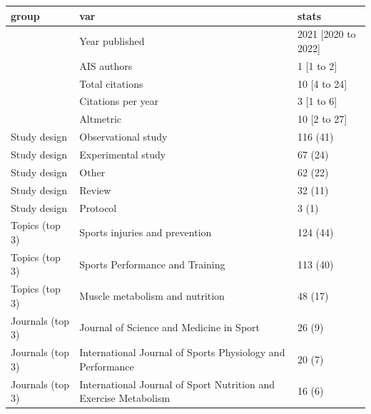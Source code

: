 \begin{table}[ht]
\centering
\begin{tabular}{lll}
 group & var & stats \\ 
  \hline
 & Year published & 2021 [2020 to 2022] \\ 
   & AIS authors & 1 [1 to 2] \\ 
   & Total citations & 10 [4 to 24] \\ 
   & Citations per year & 3 [1 to 6] \\ 
   & Altmetric & 10 [2 to 27] \\ 
  Study design & Observational study & 116 (41) \\ 
  Study design & Experimental study & 67 (24) \\ 
  Study design & Other & 62 (22) \\ 
  Study design & Review & 32 (11) \\ 
  Study design & Protocol & 3 (1) \\ 
  Topics (top 3) & Sports injuries and prevention & 124 (44) \\ 
  Topics (top 3) & Sports Performance and Training & 113 (40) \\ 
  Topics (top 3) & Muscle metabolism and nutrition & 48 (17) \\ 
  Journals (top 3) & Journal of Science and Medicine in Sport & 26 (9) \\ 
  Journals (top 3) & International Journal of Sports Physiology and Performance & 20 (7) \\ 
  Journals (top 3) & International Journal of Sport Nutrition and Exercise Metabolism & 16 (6) \\ 
  \end{tabular}
\end{table}
